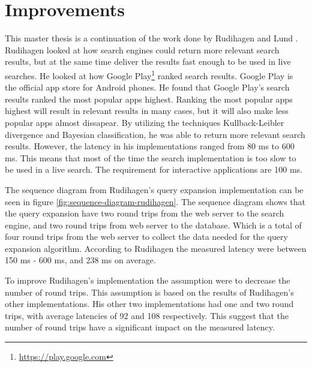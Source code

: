 \section{Improvements}
\label{sec:improvements}
This master thesis is a continuation of the work done by Rudihagen \cite{master-thesis} and Lund \cite{project-report}.
Rudihagen looked at how search engines could return more relevant search results,
but at the same time deliver the results fast enough to be used in live searches.
He looked at how Google Play\footnote{\url{https://play.google.com}} ranked search results.
Google Play is the official app store for Android phones.
He found that Google Play's search results ranked the most popular apps highest.
Ranking the most popular apps highest will result in relevant results in many cases,
but it will also make less popular apps almost dissapear.
By utilizing the techniques Kullback-Leibler divergence and Bayesian classification,
he was able to return more relevant search results.
However, the latency in his implementations ranged from 80 ms to 600 ms.
This means that most of the time the search implementation is too slow to be used in a live search.
The requirement for interactive applications are 100 ms.

The sequence diagram from Rudihagen's query expansion implementation can be seen in figure \ref{fig:sequence-diagram-rudihagen}.
The sequence diagram shows that the query expansion have two round trips from the web server to the search engine,
and two round trips from web server to the database.
Which is a total of four round trips from the web server to collect the data needed for the query expansion algorithm.
According to Rudihagen the measured latency were between 150 ms - 600 ms, and 238 ms on average.

To improve Rudihagen's implementation the assumption were to decrease the number of round trips.
This assumption is based on the results of Rudihagen's other implementations.
His other two implementations had one and two round trips,
with average latencies of 92 and 108 respectively.
This suggest that the number of round trips have a significant impact on the measured latency.

